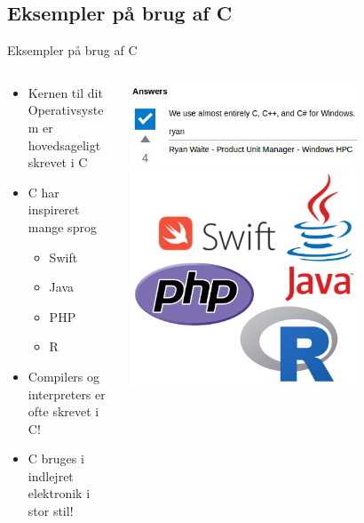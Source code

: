 \documentclass{beamer}
\begin{document}
\subsection{Eksempler på brug af C}
\begin{frame}{Eksempler på brug af C}
	\begin{columns}
	
	\begin{column}{0.5\textwidth}
	\begin{itemize}
	\item{Kernen til dit Operativsystem er hovedsageligt skrevet i C}
	\item{C har inspireret mange sprog}
		\begin{itemize}
		\item{Swift}
		\item{Java}
		\item{PHP}
		\item{R}
		\end{itemize}
	\item{Compilers og interpreters er ofte skrevet i C!}
	\item{C bruges i indlejret elektronik i stor stil!}
	\end{itemize}
	\end{column}
	
	\begin{column}{0.5\textwidth}
	\begin{center}
		\includegraphics[width=0.7\textwidth]{assets/windows-kernel.png}
		\break
		\includegraphics[width=0.7\textwidth]{assets/C-derivatives.png}
	\end{center}
	\end{column}
	
	\end{columns}
\end{frame}
\end{document}
